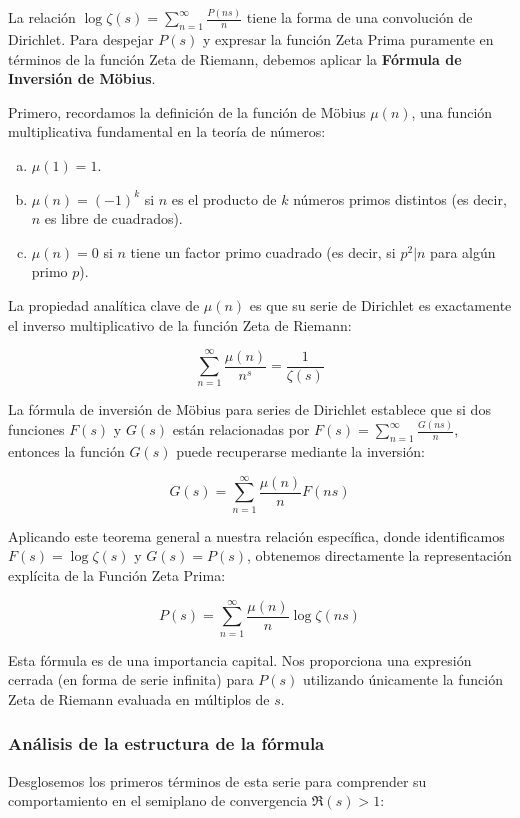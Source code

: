 La relación $\log \zeta(s) = \sum_{n=1}^{\infty} \frac{P(ns)}{n}$ tiene la forma de una convolución de Dirichlet. Para despejar $P(s)$ y expresar la función Zeta Prima puramente en términos de la función Zeta de Riemann, debemos aplicar la \textbf{Fórmula de Inversión de Möbius}.

Primero, recordamos la definición de la función de Möbius $\mu(n)$, una función multiplicativa fundamental en la teoría de números:

\begin{enumerate}[a)]
    \item $\mu(1) = 1$.
    \item $\mu(n) = (-1)^k$ si $n$ es el producto de $k$ números primos distintos (es decir, $n$ es libre de cuadrados).
    \item $\mu(n) = 0$ si $n$ tiene un factor primo cuadrado (es decir, si $p^2 | n$ para algún primo $p$).
\end{enumerate}

La propiedad analítica clave de $\mu(n)$ es que su serie de Dirichlet es exactamente el inverso multiplicativo de la función Zeta de Riemann:

$$ \sum_{n=1}^{\infty} \frac{\mu(n)}{n^s} = \frac{1}{\zeta(s)} $$

La fórmula de inversión de Möbius para series de Dirichlet establece que si dos funciones $F(s)$ y $G(s)$ están relacionadas por $F(s) = \sum_{n=1}^{\infty} \frac{G(ns)}{n}$, entonces la función $G(s)$ puede recuperarse mediante la inversión:

$$ G(s) = \sum_{n=1}^{\infty} \frac{\mu(n)}{n} F(ns) $$

Aplicando este teorema general a nuestra relación específica, donde identificamos $F(s) = \log \zeta(s)$ y $G(s) = P(s)$, obtenemos directamente la representación explícita de la Función Zeta Prima:

$$ P(s) = \sum_{n=1}^{\infty} \frac{\mu(n)}{n} \log \zeta(ns) $$

Esta fórmula es de una importancia capital. Nos proporciona una expresión cerrada (en forma de serie infinita) para $P(s)$ utilizando únicamente la función Zeta de Riemann evaluada en múltiplos de $s$. 

\subsubsection*{Análisis de la estructura de la fórmula}

Desglosemos los primeros términos de esta serie para comprender su comportamiento en el semiplano de convergencia $\Re(s) > 1$:

